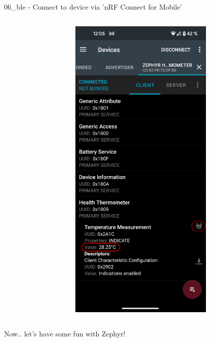 \documentclass[10pt, aspectratio=169]{beamer}
\begin{document}
\begin{frame}[fragile]{06\_ble - Connect to device via 'nRF Connect for Mobile'}
\begin{columns}[T,onlytextwidth]
\begin{figure}
      \end{figure}
      \begin{figure}
        \includegraphics[width=0.8\textwidth]{images/nrf_connect_ble_connected.png}
      \end{figure}


  \end{columns}

\end{frame}

\begin{frame}[standout]
  Now.. let's have some fun with Zephyr!
\end{frame}
\end{document}
